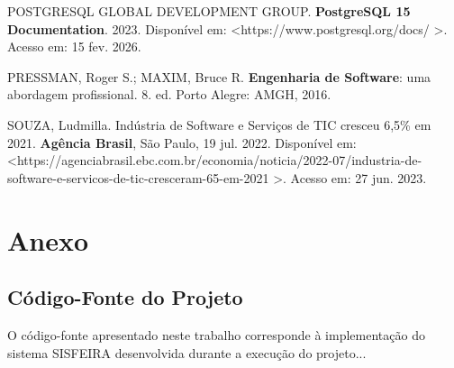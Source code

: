 \documentclass[12pt,a4paper]{article}
\begin{document}
\noindent POSTGRESQL GLOBAL DEVELOPMENT GROUP. \textbf{PostgreSQL 15 Documentation}. 2023. Disponível em: \textless https://www.postgresql.org/docs/ \textgreater. Acesso em: 15 fev. 2026.

\vspace{0.5cm}

\noindent PRESSMAN, Roger S.; MAXIM, Bruce R. \textbf{Engenharia de Software}: uma abordagem profissional. 8. ed. Porto Alegre: AMGH, 2016.

\vspace{0.5cm}

\noindent SOUZA, Ludmilla. Indústria de Software e Serviços de TIC cresceu 6,5\% em 2021. \textbf{Agência Brasil}, São Paulo, 19 jul. 2022. Disponível em: \textless https://agenciabrasil.ebc.com.br/economia/noticia/2022-07/industria-de-software-e-servicos-de-tic-cresceram-65-em-2021 \textgreater. Acesso em: 27 jun. 2023.

\newpage


\section*{Anexo}

\subsection*{Código-Fonte do Projeto}

O código-fonte apresentado neste trabalho corresponde à implementação do sistema SISFEIRA desenvolvida durante a execução do projeto...



\newpage


\clearpage


\setlength{\tabcolsep}{2pt}
\renewcommand{\arraystretch}{0.85}
\end{document}
